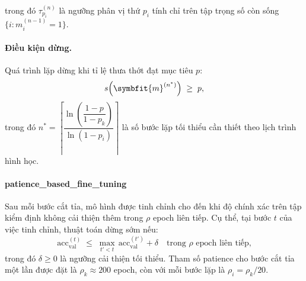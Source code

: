 trong đó $\tau_{p_i}^{(n)}$ là ngưỡng phân vị thứ $p_i$ tính chỉ trên tập trọng số còn sống $\{i : m_i^{(n-1)} = 1\}$.

\paragraph{\textbf{Điều kiện dừng.}\cite{hybrid}}
Quá trình lặp dừng khi tỉ lệ thưa thớt đạt mục tiêu $p$:
\begin{equation}
    s\!\left(\symbfit{m}^{(n^*)}\right) \;\geq\; p,
    \label{eq:stopping}
\end{equation}
trong đó $n^* = \left\lceil \dfrac{\ln\!\left(\dfrac{1-p}{1-p_k}\right)}{\ln(1-p_i)} \right\rceil$
là số bước lặp tối thiểu cần thiết theo lịch trình hình học.

\paragraph{\textbf{\gls{patience_based_fine_tuning}}}\cite{hybrid}
Sau mỗi bước cắt tỉa, mô hình được tinh chỉnh cho đến khi độ chính xác trên tập kiểm định không cải thiện thêm trong $\rho$ epoch liên tiếp.
Cụ thể, tại bước $t$ của việc tinh chỉnh, thuật toán dừng sớm nếu:
\begin{equation}
    \text{acc}_{\text{val}}^{(t)} \;\leq\; \max_{t' < t}\,\text{acc}_{\text{val}}^{(t')} + \delta
    \quad \text{trong } \rho \text{ epoch liên tiếp,}
    \label{eq:patience}
\end{equation}
trong đó $\delta \geq 0$ là ngưỡng cải thiện tối thiểu.
Tham số patience cho bước cắt tỉa một lần được đặt là $\rho_k \approx 200$ epoch,
còn với mỗi bước lặp là $\rho_i = \rho_k / 20$.


